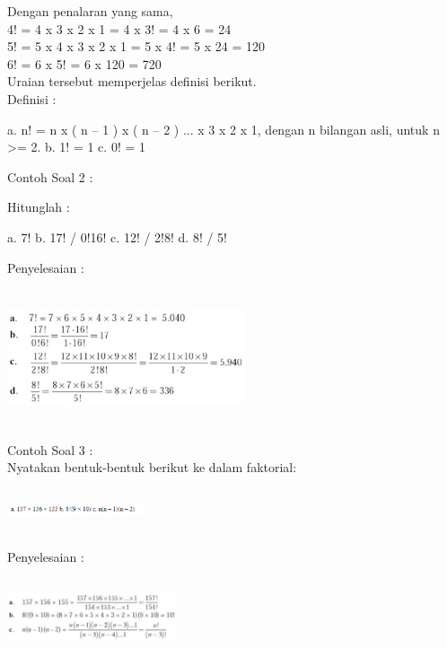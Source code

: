 \documentclass[11pt,fleqn]{book} %
\begin{document}
Dengan penalaran yang sama,\\

4! = 4 x 3 x 2 x 1 = 4 x 3! = 4 x 6 = 24\\
5! = 5 x 4 x 3 x 2 x 1 = 5 x 4! = 5 x 24 = 120\\
6! = 6 x 5! = 6 x 120 = 720\\

Uraian tersebut memperjelas definisi berikut.\\

Definisi :

a. n! = n x ( n – 1 ) x ( n – 2 ) ... x 3 x 2 x 1, dengan n bilangan asli, untuk n >=  2.
b. 1! = 1
c. 0! = 1

Contoh Soal 2 :

Hitunglah :

a. 7!
b. 17! / 0!16!
c. 12! / 2!8!
d. 8! / 5!

Penyelesaian :


\includegraphics[width = 7cm, height= 4cm]{Pictures/gen3.png}

Contoh Soal 3 :\\

Nyatakan bentuk-bentuk berikut ke dalam faktorial:\\

\includegraphics[width = 4cm, height= 2cm]{Pictures/gen5.png}\\

Penyelesaian :\\
\includegraphics[width = 5cm, height=3cm]{Pictures/gen4.png}\\
\end{document}
